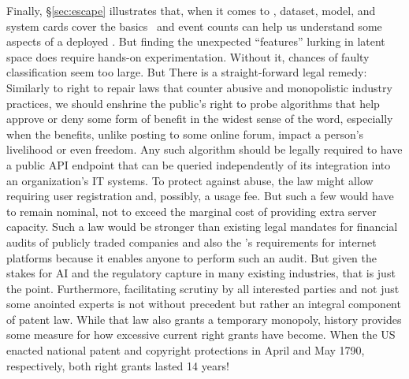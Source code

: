 Finally, \S\ref{sec:escape} illustrates that, when it comes to \AI, dataset,
model, and system cards cover the
basics~\cite{GebruMorgensternea2021,MitchellWuea2019,ProcopeCheemaea2022} and
event counts can help us understand some aspects of a deployed \AI. But finding
the unexpected ``features'' lurking in latent space does require hands-on
experimentation. Without it, chances of faulty classification seem too large.
But There is a straight-forward legal remedy: Similarly to right to repair laws
that counter abusive and monopolistic industry practices, we should enshrine the
public's right to probe algorithms that help approve or deny some form of
benefit in the widest sense of the word, especially when the benefits, unlike
posting to some online forum, impact a person's livelihood or even freedom. Any
such algorithm should be legally required to have a public API endpoint that can
be queried independently of its integration into an organization's IT systems.
To protect against abuse, the law might allow requiring user registration and,
possibly, a usage fee. But such a few would have to remain nominal, not to
exceed the marginal cost of providing extra server capacity. Such a law would be
stronger than existing legal mandates for financial audits of publicly traded
companies and also the \DSA's requirements for internet platforms because it
enables anyone to perform such an audit. But given the stakes for AI and the
regulatory capture in many existing industries, that is just the point.
Furthermore, facilitating scrutiny by all interested parties and not just some
anointed experts is not without precedent but rather an integral component of
patent law. While that law also grants a temporary monopoly, history provides
some measure for how excessive current right grants have become. When the US
enacted national patent and copyright protections in April and May 1790,
respectively, both right grants lasted 14 years!


